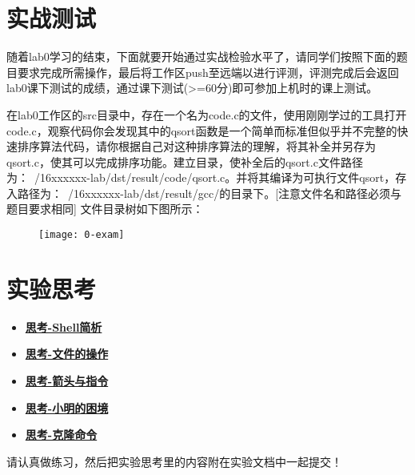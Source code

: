 \section{实战测试}
随着lab0学习的结束，下面就要开始通过实战检验水平了，请同学们按照下面的题目要求完成所需操作，最后将工作区push至远端以进行评测，评测完成后会返回lab0课下测试的成绩，通过课下测试(>=60分)即可参加上机时的课上测试。
\begin{exercise}
在lab0工作区的src目录中，存在一个名为code.c的文件，使用刚刚学过的工具打开code.c，观察代码你会发现其中的qsort函数是一个简单而标准但似乎并不完整的快速排序算法代码，请你根据自己对这种排序算法的理解，将其补全并另存为qsort.c，使其可以完成排序功能。建立目录，使补全后的qsort.c文件路径为：~/16xxxxxx-lab/dst/result/code/qsort.c。并将其编译为可执行文件qsort，存入路径为：~/16xxxxxx-lab/dst/result/gcc/的目录下。[注意文件名和路径必须与题目要求相同]
文件目录树如下图所示：
\end{exercise}
\begin{figure}[htbp]
  \centering
  \texttt{[image: 0-exam]}
\end{figure}

\section{实验思考}
\begin{itemize}
\item \hyperref[think-Shell简析]{\textbf{\textcolor{baseB}{思考-Shell简析}}}
\item \hyperref[think-文件的操作]{\textbf{\textcolor{baseB}{思考-文件的操作}}}
\item \hyperref[think-箭头与指令]{\textbf{\textcolor{baseB}{思考-箭头与指令}}}
\item \hyperref[think-小明的困境]{\textbf{\textcolor{baseB}{思考-小明的困境}}}
\item \hyperref[think-克隆]{\textbf{\textcolor{baseB}{思考-克隆命令}}}
\end{itemize}

请认真做练习，然后把实验思考里的内容附在实验文档中一起提交！
